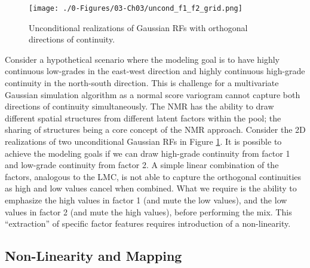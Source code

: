 \begin{figure}[htb!]
    \centering
    \texttt{[image: ./0-Figures/03-Ch03/uncond\_f1\_f2\_grid.png]}
    \caption{Unconditional realizations of Gaussian \glspl{RF} with orthogonal directions of continuity.}
    \label{fig:uncond_f1_f2_grid}
\end{figure}

Consider a hypothetical scenario where the modeling goal is to have highly continuous low-grades in the east-west direction and highly continuous high-grade continuity in the north-south direction. This is challenge for a multivariate Gaussian simulation algorithm as a normal score variogram cannot capture both directions of continuity simultaneously. The \gls{NMR} has the ability to draw different spatial structures from different latent factors within the pool; the sharing of structures being a core concept of the \gls{NMR} approach. Consider the \gls{2D} realizations of two unconditional Gaussian \glspl{RF} in Figure \ref{fig:uncond_f1_f2_grid}. It is possible to achieve the modeling goals if we can draw high-grade continuity from factor 1 and low-grade continuity from factor 2. A simple linear combination of the factors, analogous to the \gls{LMC}, is not able to capture the orthogonal continuities as high and low values cancel when combined. What we require is the ability to emphasize the high values in factor 1 (and mute the low values), and the low values in factor 2 (and mute the high values), before performing the mix. This ``extraction'' of specific factor features requires introduction of a non-linearity.


\FloatBarrier
\subsection{Non-Linearity and Mapping}
\label{subsec:03nonlinear}


